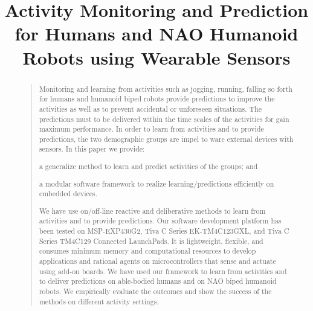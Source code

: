 \documentclass[letterpaper]{article}
\begin{document}
%
\title{Activity Monitoring and Prediction for Humans and NAO Humanoid Robots using 
Wearable Sensors}
\maketitle
\begin{abstract}
\begin{quote}
Monitoring and learning from activities such as jogging, running, falling so forth for humans and 
humanoid biped robots provide predictions to improve the activities as well as to prevent 
accidental or unforeseen situations. The predictions must to be delivered within the time scales of 
the activities for gain maximum performance. In order to learn from activities and to provide 
predictions, the two demographic groups are impel to ware external devices with sensors. In this 
paper we provide: \begin{inparaenum}[1)] \item a generalize method to learn and predict activities 
of the groups; and \item a modular software framework to realize learning/predictions 
efficiently on embedded devices. \end{inparaenum} We have use on/off-line reactive and deliberative 
methods to learn from activities and to provide predictions. Our software development platform has 
been tested on MSP-EXP430G2, Tiva C Series EK-TM4C123GXL, and Tiva C Series TM4C129 Connected 
LaunchPads. It is lightweight, flexible, and consumes minimum memory and computational 
resources to develop applications and rational agents on microcontrollers that sense and actuate 
using add-on boards. We have used our framework to learn from activities and to deliver predictions 
on able-bodied humans and on NAO biped humanoid robots. We empirically evaluate the outcomes and 
show the success of the methods on different activity settings. 
\end{quote}
\end{abstract}
\end{document}
